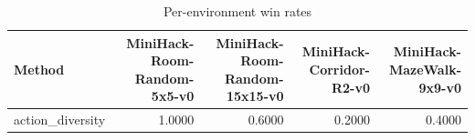 \begin{table}[htbp]
\centering
\caption{Per-environment win rates}
\label{tab:per-env}
\begin{tabular}{lrrrr}
\toprule
\textbf{Method} & \textbf{MiniHack-Room-Random-5x5-v0} & \textbf{MiniHack-Room-Random-15x15-v0} & \textbf{MiniHack-Corridor-R2-v0} & \textbf{MiniHack-MazeWalk-9x9-v0} \\
\midrule
action\_diversity & 1.0000 & 0.6000 & 0.2000 & 0.4000 \\
\bottomrule
\end{tabular}
\end{table}